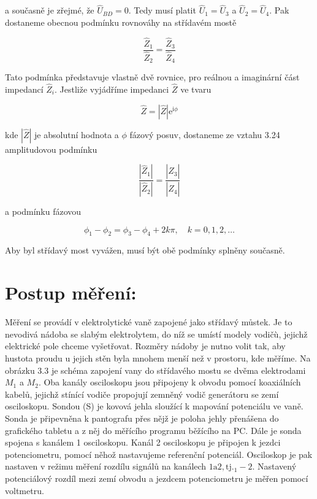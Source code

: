 \documentclass[10pt]{article}
\begin{document}
a současně je zřejmé, že $\hat{U}_{B D}=0$. Tedy musí platit $\hat{U}_{1}=\hat{U}_{3}$ a $\hat{U}_{2}=\hat{U}_{4}$. Pak dostaneme obecnou podmínku rovnováhy na střídavém mostě


\begin{equation*}
\frac{\hat{Z}_{1}}{\hat{Z}_{2}}=\frac{\hat{Z}_{3}}{\hat{Z}_{4}} \tag{3.24}
\end{equation*}


Tato podmínka představuje vlastně dvě rovnice, pro reálnou a imaginární část impedancí $\hat{Z}_{i}$. Jestliže vyjádříme impedanci $\hat{Z}$ ve tvaru


\begin{equation*}
\hat{Z}=|\hat{Z}| \mathrm{e}^{\mathrm{i} \phi} \tag{3.25}
\end{equation*}


kde $|\hat{Z}|$ je absolutní hodnota a $\phi$ fázový posuv, dostaneme ze vztahu 3.24 amplitudovou podmínku


\begin{equation*}
\frac{\left|\hat{Z}_{1}\right|}{\left|\hat{Z}_{2}\right|}=\frac{\left|\hat{Z}_{3}\right|}{\left|\hat{Z}_{4}\right|} \tag{3.26}
\end{equation*}


a podmínku fázovou


\begin{equation*}
\phi_{1}-\phi_{2}=\phi_{3}-\phi_{4}+2 k \pi, \quad k=0,1,2, \ldots \tag{3.27}
\end{equation*}


Aby byl střídavý most vyvážen, musí být obě podmínky splněny současně.

\section*{Postup měření:}
Měření se provádí v elektrolytické vaně zapojené jako střídavý můstek. Je to nevodivá nádoba se slabým elektrolytem, do níž se umístí modely vodičù, jejichž elektrické pole chceme vyšetřovat. Rozměry nádoby je nutno volit tak, aby hustota proudu u jejich stěn byla mnohem menší než v prostoru, kde měříme. Na obrázku 3.3 je schéma zapojení vany do střídavého mostu se dvěma elektrodami $M_{1}$ a $M_{2}$. Oba kanály osciloskopu jsou připojeny k obvodu pomocí koaxiálních kabelů, jejichž stínící vodiče propojují zemněný vodič generátoru se zemí osciloskopu. Sondou (S) je kovová jehla sloužící k mapování potenciálu ve vaně. Sonda je připevněna k pantografu přes nějž je poloha jehly přenášena do grafického tabletu a z něj do měřícího programu běžícího na PC. Dále je sonda spojena s kanálem 1 osciloskopu. Kanál 2 osciloskopu je připojen k jezdci potenciometru, pomocí něhož nastavujeme referenční potenciál. Osciloskop je pak nastaven v režimu měření rozdílu signálů na kanálech $1 \mathrm{a} 2, \mathrm{tj} .{ }_{1}-2$. Nastavený potenciálový rozdíl mezi zemí obvodu a jezdcem potenciometru je měřen pomocí voltmetru.
\end{document}
